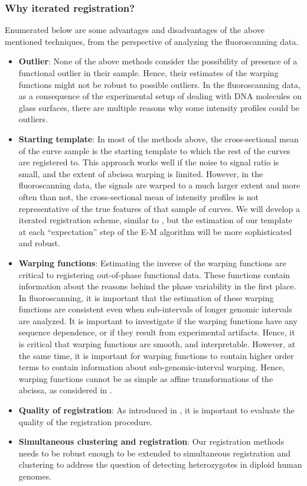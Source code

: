 \subsubsection{Why iterated registration?}
Enumerated below are some advantages and disadvantages of the above mentioned techniques, from the perspective of analyzing the fluoroscanning data.
\begin{itemize}
\item {\bf{Outlier}}: None of the above methods consider the possibility of presence of a functional outlier in their sample. Hence, their estimates of the warping functions might not be robust to possible outliers. In the fluoroscanning data, as a consequence of the experimental setup of dealing with DNA molecules on glass surfaces, there are multiple reasons why some intensity profiles could be outliers. 

\item {\bf{Starting template}}: In most of the methods above, the cross-sectional mean of the curve sample is the starting template to which the rest of the curves are registered to. This approach works well if the noise to signal ratio is small, and the extent of abcissa warping is limited. However, in the fluoroscanning data, the signals are warped to a much larger extent and more often than not, the cross-sectional mean of intensity profiles is not representative of the true features of that sample of curves. We will develop a iterated registration scheme, similar to \cite{Sangalli_etal_2009_JASA}, but the estimation of our template at each ``expectation'' step of the E-M algorithm will be more sophisticated and robust.

\item {\bf{Warping functions}}: Estimating the inverse of the warping functions are critical to registering out-of-phase functional data. These functions contain information about the reasons behind the phase variability in the first place. In fluoroscanning, it is important that the estimation of these warping functions are consistent even when sub-intervals of longer genomic intervals are analyzed. It is important to investigate if the warping functions have any sequence dependence, or if they result from experimental artifacts. Hence, it is critical that warping functions are smooth, and interpretable. However, at the same time, it is important for warping functions to contain higher order terms to contain information about sub-genomic-interval warping. Hence, warping functions cannot be as simple as affine transformations of the abcissa, as considered in \cite{Sangalli_etal_2009_JASA}. 

\item {\bf{Quality of registration}}: As introduced in \cite{Sangalli_etal_2009_JASA}, it is important to evaluate the quality of the registration procedure. 

\item {\bf{Simultaneous clustering and registration}}: Our registration methods needs to be robust enough to be extended to simultaneous registration and clustering to address the question of detecting heterozygotes in diploid human genomes.  
\end{itemize}


